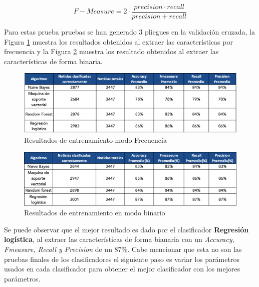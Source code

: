 \begin{equation}\label{eq:3}
	 F-Measure = 2 \cdot \frac{precision \cdot recall}{precision+recall}
\end{equation}





Para estas prueba pruebas se han generado 3 pliegues en la validación cruzada, la Figura \ref{fig:matrizfrecuencia} muestra los resultados obtenidos al extraer las características por frecuencia y la Figura \ref{fig:matrizbinario} muestra los resultado obtenidos al extraer las características de forma binaria.

\begin{figure}[h]
\centering
\includegraphics[scale=0.45]{imagenes/Resultados/MatrizFrecuencia.png}
\caption{Resultados de entrenamiento modo Frecuencia}
\label{fig:matrizfrecuencia}
\end{figure}

\begin{figure}[h]
\centering
\includegraphics[scale=0.45]{imagenes/Resultados/MatrizBinario.png}
\caption{Resultados de entrenamiento en modo binario}
\label{fig:matrizbinario}
\end{figure}


Se puede observar que el mejor resultado es dado por el clasificador \textbf{Regresión logística}, al extraer las características de forma bianaria con un \textit{Accuracy, Fmeasure, Recall y Precision} de un 87\%. Cabe mencionar que esta no son las pruebas finales de los clasificadores el siguiente paso es variar los parámetros usados en cada clasificador para obtener el mejor clasificador con los mejores parámetros.